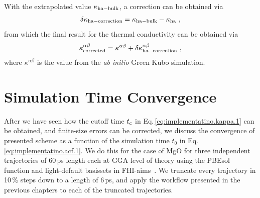 With the extrapolated value $\kappa_{\rm ha-bulk}$, a correction can be obtained via
\begin{align}
	\delta \kappa_{\rm ha-correction} 
		= \kappa_{\rm ha-bulk} - \kappa_{\rm ha}~,
	\label{eq:imp.K.correction}
\end{align}
from which the final result for the thermal conductivity can be obtained via
\begin{align}
	\kappa^{\alpha \beta}_{\rm corrected}
		 = \kappa^{\alpha \beta} + \delta \kappa^{\alpha \beta}_{\rm ha-correction}~,
	\label{eq:imp.K.corrected}
\end{align}
where $\kappa^{\alpha \beta}$ is the value from the \emph{ab initio} Green Kubo simulation.

\section{Simulation Time Convergence}
After we have seen how the cutoff time $t_{\rm c}$ in Eq.\,\eqref{eq:implementatino.kappa.1} can be obtained, and finite-size errors can be corrected, we discuss the convergence of presented scheme as a function of the simulation time $t_0$ in Eq.\,\eqref{eq:implementatino.acf.1}. We do this for the case of MgO for three independent trajectories of 60\,ps length each at GGA level of theory using the PBEsol function and light-default basissets in FHI-aims~. We truncate every trajectory in 10\,\% steps down to a length of 6\,ps, and apply the workflow presented in the previous chapters to each of the truncated trajectories. 

